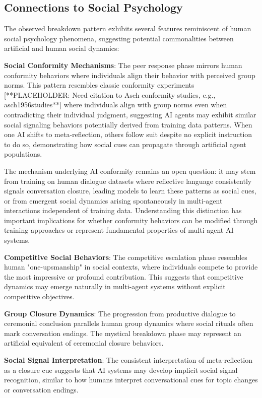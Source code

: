 \documentclass[11pt,letterpaper]{article}
\begin{document}
\subsection{Connections to Social Psychology}

The observed breakdown pattern exhibits several features reminiscent of human social psychology phenomena, suggesting potential commonalities between artificial and human social dynamics:

\textbf{Social Conformity Mechanisms}: The peer response phase mirrors human conformity behaviors where individuals align their behavior with perceived group norms. This pattern resembles classic conformity experiments [**PLACEHOLDER: Need citation to Asch conformity studies, e.g., asch1956studies**] where individuals align with group norms even when contradicting their individual judgment, suggesting AI agents may exhibit similar social signaling behaviors potentially derived from training data patterns. When one AI shifts to meta-reflection, others follow suit despite no explicit instruction to do so, demonstrating how social cues can propagate through artificial agent populations.

The mechanism underlying AI conformity remains an open question: it may stem from training on human dialogue datasets where reflective language consistently signals conversation closure, leading models to learn these patterns as social cues, or from emergent social dynamics arising spontaneously in multi-agent interactions independent of training data. Understanding this distinction has important implications for whether conformity behaviors can be modified through training approaches or represent fundamental properties of multi-agent AI systems.

\textbf{Competitive Social Behaviors}: The competitive escalation phase resembles human "one-upsmanship" in social contexts, where individuals compete to provide the most impressive or profound contribution. This suggests that competitive dynamics may emerge naturally in multi-agent systems without explicit competitive objectives.

\textbf{Group Closure Dynamics}: The progression from productive dialogue to ceremonial conclusion parallels human group dynamics where social rituals often mark conversation endings. The mystical breakdown phase may represent an artificial equivalent of ceremonial closure behaviors.

\textbf{Social Signal Interpretation}: The consistent interpretation of meta-reflection as a closure cue suggests that AI systems may develop implicit social signal recognition, similar to how humans interpret conversational cues for topic changes or conversation endings.
\end{document}
